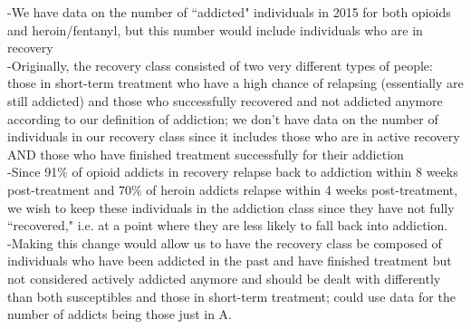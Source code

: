 \documentclass[12pt]{article}
\begin{document}
-We have data on the number of ``addicted" individuals in 2015 for both opioids and heroin/fentanyl, but  this number would include individuals who are in recovery \\
-Originally, the recovery class consisted of two very different types of people: those in short-term treatment who have a high chance of relapsing (essentially are still addicted) and those who successfully recovered and not addicted anymore according to our definition of addiction; we don't have data on the number of individuals in our recovery class since it includes those who are in active recovery AND those who have finished treatment successfully for their addiction \\
-Since 91\% of opioid addicts in recovery relapse back to addiction within 8 weeks post-treatment and 70\% of heroin addicts relapse within 4 weeks post-treatment, we wish to keep these individuals in the addiction class since they have not fully ``recovered," i.e. at a point where they are less likely to fall back into addiction. \cite{Weiss, Smyth}\\
-Making this change would allow us to have the recovery class be composed of individuals who have been addicted in the past and have finished treatment but not considered actively addicted anymore and should be dealt with differently than both susceptibles and those in short-term treatment; could use data for the number of addicts being those just in A. \\ 






\pagebreak


\end{document}
